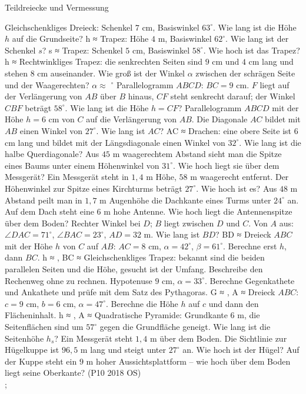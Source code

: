 \begin{aufgabe}{Teildreiecke und Vermessung}
\begin{teile}
\teil Gleichschenkliges Dreieck: Schenkel $7$ cm, Basiswinkel $63^\circ$. Wie lang ist die Höhe $h$ auf die Grundseite? h ≈ \leerfeld[cm]
\teil Trapez: Höhe $4$ m, Basiswinkel $62^\circ$. Wie lang ist der Schenkel $s$? s ≈ \leerfeld[m]
\teil Trapez: Schenkel $5$ cm, Basiswinkel $58^\circ$. Wie hoch ist das Trapez? h ≈ \leerfeld[cm]
\teil Rechtwinkliges Trapez: die senkrechten Seiten sind $9$ cm und $4$ cm lang und stehen $8$ cm auseinander. Wie groß ist der Winkel $\alpha$ zwischen der schrägen Seite und der Waagerechten? $\alpha \approx$ \leerfeld $^\circ$
\teil Parallelogramm $ABCD$: $BC = 9$ cm. $F$ liegt auf der Verlängerung von $AB$ über $B$ hinaus, $CF$ steht senkrecht darauf; der Winkel $CBF$ beträgt $58^\circ$. Wie lang ist die Höhe $h = CF$? \leerfeld[cm]
\teil Parallelogramm $ABCD$ mit der Höhe $h = 6$ cm von $C$ auf die Verlängerung von $AB$. Die Diagonale $AC$ bildet mit $AB$ einen Winkel von $27^\circ$. Wie lang ist $AC$? AC ≈ \leerfeld[cm]
\teil Drachen: eine obere Seite ist $6$ cm lang und bildet mit der Längsdiagonale einen Winkel von $32^\circ$. Wie lang ist die halbe Querdiagonale? \leerfeld[cm]
\teil Aus $45$ m waagerechtem Abstand sieht man die Spitze eines Baums unter einem Höhenwinkel von $31^\circ$. Wie hoch liegt sie über dem Messgerät? \leerfeld[m]
\teil Ein Messgerät steht in $1{,}4$ m Höhe, $58$ m waagerecht entfernt. Der Höhenwinkel zur Spitze eines Kirchturms beträgt $27^\circ$. Wie hoch ist es? \leerfeld[m]
\teil Aus $48$ m Abstand peilt man in $1{,}7$ m Augenhöhe die Dachkante eines Turms unter $24^\circ$ an. Auf dem Dach steht eine $6$ m hohe Antenne. Wie hoch liegt die Antennenspitze über dem Boden? \leerfeld[m]
\teil Rechter Winkel bei $D$; $B$ liegt zwischen $D$ und $C$. Von $A$ aus: $\angle DAC = 71^\circ$, $\angle BAC = 23^\circ$, $AD = 32$ m. Wie lang ist $BD$? BD ≈ \leerfeld[m]
\teil Dreieck $ABC$ mit der Höhe $h$ von $C$ auf $AB$: $AC = 8$ cm, $\alpha = 42^\circ$, $\beta = 61^\circ$. Berechne erst $h$, dann $BC$. h ≈ \leerfeld[cm] , BC ≈ \leerfeld[cm]
\teil Gleichschenkliges Trapez: bekannt sind die beiden parallelen Seiten und die Höhe, gesucht ist der Umfang. Beschreibe den Rechenweg ohne zu rechnen.
\teil Hypotenuse $9$ cm, $\alpha = 33^\circ$. Berechne Gegenkathete und Ankathete und prüfe mit dem Satz des Pythagoras. G ≈ \leerfeld[cm] , A ≈ \leerfeld[cm]
\teil Dreieck $ABC$: $c = 9$ cm, $b = 6$ cm, $\alpha = 47^\circ$. Berechne die Höhe $h$ auf $c$ und dann den Flächeninhalt. h ≈ \leerfeld[cm] , A ≈ \leerfeld[cm²]
\teil Quadratische Pyramide: Grundkante $6$ m, die Seitenflächen sind um $57^\circ$ gegen die Grundfläche geneigt. Wie lang ist die Seitenhöhe $h_s$? \leerfeld[m]
\teil Ein Messgerät steht $1{,}4$ m über dem Boden. Die Sichtlinie zur Hügelkuppe ist $96{,}5$ m lang und steigt unter $27^\circ$ an. Wie hoch ist der Hügel? Auf der Kuppe steht ein $9$ m hoher Aussichtsplattform – wie hoch über dem Boden liegt seine Oberkante? \hfill (P10 2018 OS) \\ \leerfeld[m] ; \leerfeld[m]
\end{teile}
\end{aufgabe}

